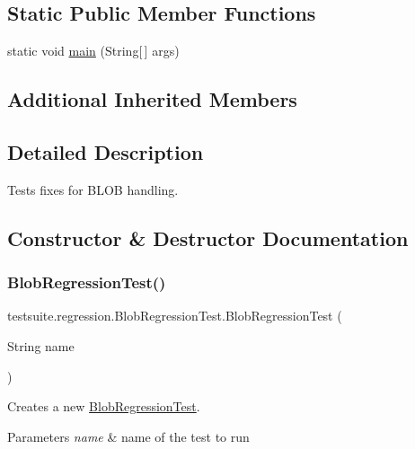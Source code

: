 \subsection*{Static Public Member Functions}
\begin{DoxyCompactItemize}
\item 
static void \mbox{\hyperlink{classtestsuite_1_1regression_1_1_blob_regression_test_a73ef0a3e9cca8b19e17d3eebc78da04c}{main}} (String\mbox{[}$\,$\mbox{]} args)
\end{DoxyCompactItemize}
\subsection*{Additional Inherited Members}


\subsection{Detailed Description}
Tests fixes for B\+L\+OB handling. 

\subsection{Constructor \& Destructor Documentation}
\mbox{\label{classtestsuite_1_1regression_1_1_blob_regression_test_a960d4c157630ea6a429f73ee43ca0c3a}} 
\subsubsection{\texorpdfstring{Blob\+Regression\+Test()}{BlobRegressionTest()}}
{\footnotesize\ttfamily testsuite.\+regression.\+Blob\+Regression\+Test.\+Blob\+Regression\+Test (\begin{DoxyParamCaption}\item[{String}]{name }\end{DoxyParamCaption})}

Creates a new \mbox{\hyperlink{classtestsuite_1_1regression_1_1_blob_regression_test}{Blob\+Regression\+Test}}.


\begin{DoxyParams}{Parameters}
{\em name} & name of the test to run \\
\hline
\end{DoxyParams}


